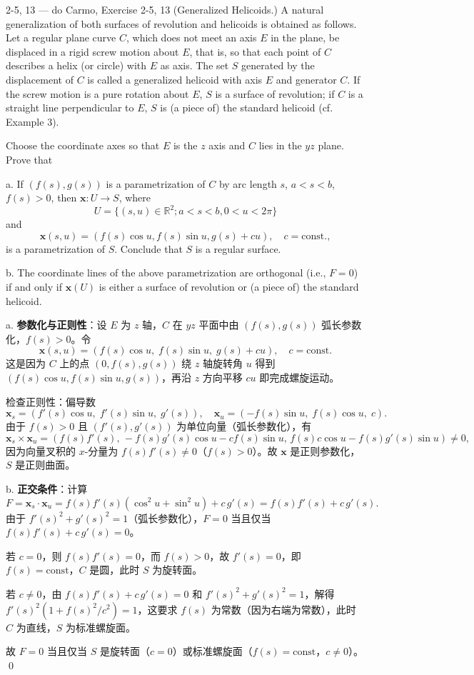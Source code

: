 \begin{exercise}{2-5, 13 — do Carmo, Exercise 2-5, 13}
(Generalized Helicoids.) A natural generalization of both surfaces of revolution and helicoids is obtained as follows. Let a regular plane curve $C$, which does not meet an axis $E$ in the plane, be displaced in a rigid screw motion about $E$, that is, so that each point of $C$ describes a helix (or circle) with $E$ as axis. The set $S$ generated by the displacement of $C$ is called a generalized helicoid with axis $E$ and generator $C$. If the screw motion is a pure rotation about $E$, $S$ is a surface of revolution; if $C$ is a straight line perpendicular to $E$, $S$ is (a piece of) the standard helicoid (cf. Example 3).

Choose the coordinate axes so that $E$ is the $z$ axis and $C$ lies in the $yz$ plane. Prove that

a. If $(f(s), g(s))$ is a parametrization of $C$ by arc length $s$, $a < s < b$, $f(s) > 0$, then $\mathbf{x}: U \to S$, where
\[
U = \{(s, u) \in \mathbb{R}^2; a < s < b, 0 < u < 2\pi\}
\]
and
\[
\mathbf{x}(s, u) = (f(s) \cos u, f(s) \sin u, g(s) + cu), \quad c = \mathrm{const.},
\]
is a parametrization of $S$. Conclude that $S$ is a regular surface.

b. The coordinate lines of the above parametrization are orthogonal (i.e., $F = 0$) if and only if $\mathbf{x}(U)$ is either a surface of revolution or (a piece of) the standard helicoid.
\end{exercise}

\begin{solution}
a. \textbf{参数化与正则性}：设 $E$ 为 $z$ 轴，$C$ 在 $yz$ 平面中由 $(f(s), g(s))$ 弧长参数化，$f(s) > 0$。令
\[
\mathbf{x}(s, u) = (f(s)\cos u,\; f(s)\sin u,\; g(s) + cu),\quad c = \mathrm{const.}
\]
这是因为 $C$ 上的点 $(0, f(s), g(s))$ 绕 $z$ 轴旋转角 $u$ 得到 $(f(s)\cos u, f(s)\sin u, g(s))$，再沿 $z$ 方向平移 $cu$ 即完成螺旋运动。

检查正则性：偏导数
\[
\mathbf{x}_s = (f'(s)\cos u,\; f'(s)\sin u,\; g'(s)),\quad
\mathbf{x}_u = (-f(s)\sin u,\; f(s)\cos u,\; c).
\]
由于 $f(s) > 0$ 且 $(f'(s), g'(s))$ 为单位向量（弧长参数化），有
\[
\mathbf{x}_s \times \mathbf{x}_u = (f(s)f'(s),\, -f(s)g'(s)\cos u - c f(s)\sin u,\, f(s)c\cos u - f(s)g'(s)\sin u) \neq 0,
\]
因为向量叉积的 $x$-分量为 $f(s)f'(s) \neq 0$（$f(s) > 0$）。故 $\mathbf{x}$ 是正则参数化，$S$ 是正则曲面。

b. \textbf{正交条件}：计算
\[
F = \mathbf{x}_s \cdot \mathbf{x}_u = f(s)f'(s)(\cos^2 u + \sin^2 u) + c\, g'(s) = f(s)f'(s) + c\, g'(s).
\]
由于 $f'(s)^2 + g'(s)^2 = 1$（弧长参数化），$F = 0$ 当且仅当 $f(s)f'(s) + c\, g'(s) = 0$。

若 $c = 0$，则 $f(s)f'(s) = 0$，而 $f(s) > 0$，故 $f'(s) = 0$，即 $f(s) = \mathrm{const}$，$C$ 是圆，此时 $S$ 为旋转面。

若 $c \neq 0$，由 $f(s)f'(s) + c\, g'(s) = 0$ 和 $f'(s)^2 + g'(s)^2 = 1$，解得 $f'(s)^2(1 + f(s)^2/c^2) = 1$，这要求 $f(s)$ 为常数（因为右端为常数），此时 $C$ 为直线，$S$ 为标准螺旋面。

故 $F = 0$ 当且仅当 $S$ 是旋转面（$c = 0$）或标准螺旋面（$f(s) = \mathrm{const}$，$c \neq 0$）。
\qed
\end{solution}

